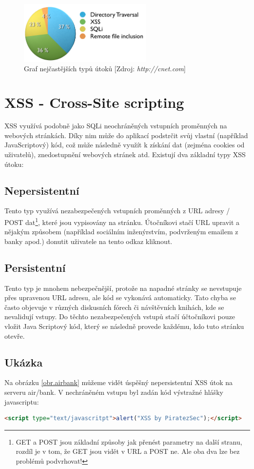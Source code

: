 \documentclass[12pt, a4paper]{report}
\begin{document}
\begin{figure}[h!]
\centerline{\includegraphics[width=250px]{./examples/chart.png}}
\caption{Graf nejčastějších typů útoků [Zdroj: \textit{http://cnet.com}]}
\label{chart.attack_list}
\end{figure}


\section{XSS - Cross-Site scripting}
XSS využívá podobně jako SQLi neochráněných vstupních proměnných na webových stránkách. Díky nim může do aplikací podstrčit svůj vlastní (například JavaScriptový) kód, což může následně využít k získání dat (zejména cookies od uživatelů), znedostupnění webových stránek atd. Existují dva základní typy XSS útoku:

\subsection{Nepersistentní}
Tento typ využívá nezabezpečených vstupních proměnných z URL adresy / POST dat\footnote{GET a POST jsou základní způsoby jak přenést parametry na další stranu, rozdíl je v tom, že GET jsou vidět v URL a POST ne. Ale oba dva lze bez problémů podvrhovat!}, které jsou vypisovány na stránku. Útočníkovi stačí URL upravit a nějakým způsobem (například sociálním inženýrstvím, podvrženým emailem z banky apod.) donutit uživatele na tento odkaz kliknout. 

\subsection{Persistentní}
Tento typ je mnohem nebezpečnější, protože na napadné stránky se nevstupuje přes upravenou URL adresu, ale kód se vykonává automaticky. Tato chyba se často objevuje v různých diskusních fórech či návštěvních knihách, kde se nevalidují vstupy. Do těchto nezabezpečených vstupů stačí účtočníkovi pouze vložit Java Scriptový kód, který se následně provede každému, kdo tuto stránku otevře. 

\subsection{Ukázka}
Na obrázku \ref{obr.airbank} můžeme vidět úspěšný nepersistentní XSS útok na serveru air/bank. V nechráněném vstupu byl zadán kód výstražné hlášky javascriptu:
\begin{lstlisting}[label=some-code, language=HTML, caption=Výstražná hláška v jazyce JavaScript]
<script type="text/javascritpt">alert("XSS by PiratezSec");</script>
\end{lstlisting}
\end{document}

